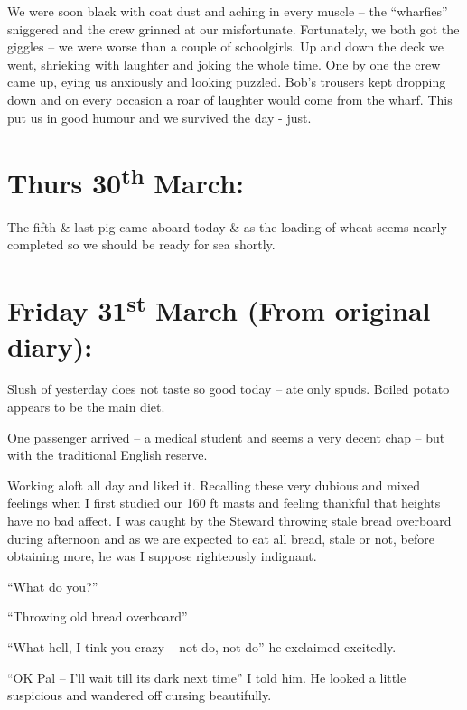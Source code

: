 \documentclass[
  11pt,
  msmallroyalvopaper
]{memoir}
\begin{document}
We were soon black with coat dust and aching in every muscle -- the
``wharfies'' sniggered and the crew grinned at our misfortunate.
Fortunately, we both got the giggles -- we were worse than a couple of
schoolgirls. Up and down the deck we went, shrieking with laughter and
joking the whole time. One by one the crew came up, eying us anxiously
and looking puzzled. Bob's trousers kept dropping down and on every
occasion a roar of laughter would come from the wharf. This put us in
good humour and we survived the day - just.

\hypertarget{thurs-30th-march}{%
\section{\texorpdfstring{Thurs 30\textsuperscript{th}
March:}{Thurs 30th March:}}\label{thurs-30th-march}}

The fifth \& last pig came aboard today \& as the loading of wheat seems
nearly completed so we should be ready for sea shortly.

\hypertarget{friday-31st-march-from-original-diary}{%
\section{\texorpdfstring{Friday 31\textsuperscript{st} March (From
original
diary):}{Friday 31st March (From original diary):}}\label{friday-31st-march-from-original-diary}}

Slush of yesterday does not taste so good today -- ate only spuds.
Boiled potato appears to be the main diet.

One passenger arrived -- a medical student and seems a very decent chap
-- but with the traditional English reserve.

Working aloft all day and liked it. Recalling these very dubious and
mixed feelings when I first studied our 160 ft masts and feeling
thankful that heights have no bad affect. I was caught by the Steward
throwing stale bread overboard during afternoon and as we are expected
to eat all bread, stale or not, before obtaining more, he was I suppose
righteously indignant.

``What do you?''

``Throwing old bread overboard''

``What hell, I tink you crazy -- not do, not do'' he exclaimed
excitedly.

``OK Pal -- I'll wait till its dark next time'' I told him. He looked a
little suspicious and wandered off cursing beautifully.
\end{document}
